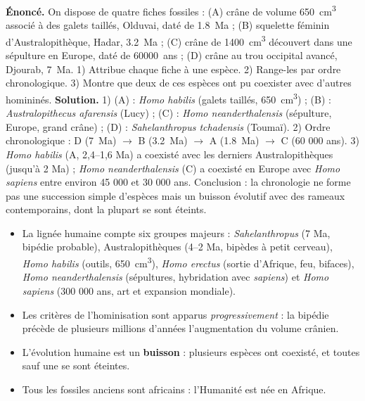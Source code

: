 \documentclass[11pt]{article}
\begin{document}
\begin{exoresolu}
\textbf{Énoncé.} On dispose de quatre fiches fossiles : (A) crâne de volume \SI{650}{cm^3} associé à des galets taillés, Olduvai, daté de \SI{1,8}{Ma} ; (B) squelette féminin d'Australopithèque, Hadar, \SI{3,2}{Ma} ; (C) crâne de \SI{1400}{cm^3} découvert dans une sépulture en Europe, daté de \SI{60000}{ans} ; (D) crâne au trou occipital avancé, Djourab, \SI{7}{Ma}. 1) Attribue chaque fiche à une espèce. 2) Range-les par ordre chronologique. 3) Montre que deux de ces espèces ont pu coexister avec d'autres homininés.
\tcblower
\textbf{Solution.} 1) (A) : \emph{Homo habilis} (galets taillés, \SI{650}{cm^3}) ; (B) : \emph{Australopithecus afarensis} (Lucy) ; (C) : \emph{Homo neanderthalensis} (sépulture, Europe, grand crâne) ; (D) : \emph{Sahelanthropus tchadensis} (Toumaï). 2) Ordre chronologique : D (\SI{7}{Ma}) $\rightarrow$ B (\SI{3,2}{Ma}) $\rightarrow$ A (\SI{1,8}{Ma}) $\rightarrow$ C (60 000 ans). 3) \emph{Homo habilis} (A, 2,4--1,6 Ma) a coexisté avec les derniers Australopithèques (jusqu'à 2 Ma) ; \emph{Homo neanderthalensis} (C) a coexisté en Europe avec \emph{Homo sapiens} entre environ 45 000 et 30 000 ans. Conclusion : la chronologie ne forme pas une succession simple d'espèces mais un buisson évolutif avec des rameaux contemporains, dont la plupart se sont éteints.
\end{exoresolu}

\begin{aretenir}
\begin{itemize}
\item La lignée humaine compte six groupes majeurs : \emph{Sahelanthropus} (7 Ma, bipédie probable), Australopithèques (4--2 Ma, bipèdes à petit cerveau), \emph{Homo habilis} (outils, \SI{650}{cm^3}), \emph{Homo erectus} (sortie d'Afrique, feu, bifaces), \emph{Homo neanderthalensis} (sépultures, hybridation avec \emph{sapiens}) et \emph{Homo sapiens} (300 000 ans, art et expansion mondiale).
\item Les critères de l'hominisation sont apparus \emph{progressivement} : la bipédie précède de plusieurs millions d'années l'augmentation du volume crânien.
\item L'évolution humaine est un \textbf{buisson} : plusieurs espèces ont coexisté, et toutes sauf une se sont éteintes.
\item Tous les fossiles anciens sont africains : l'Humanité est née en Afrique.
\end{itemize}
\end{aretenir}
\end{document}
